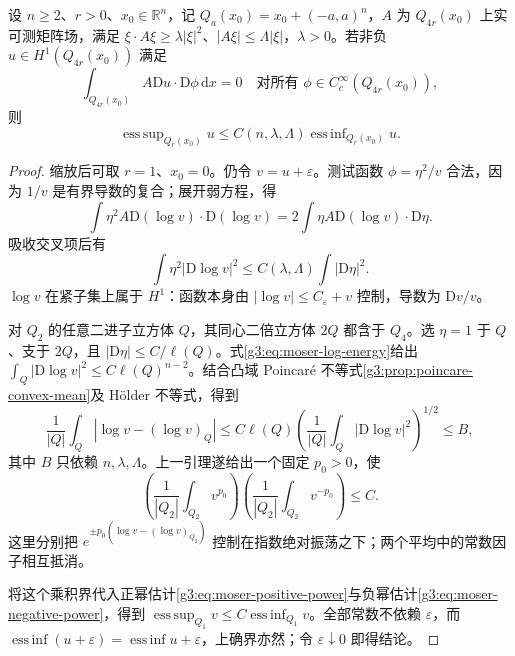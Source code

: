 \begin{theorem}\label{g3:thm:moser-harnack}
	设 \(n\ge2\)、\(r>0\)、\(x_0\in\mathbb R^n\)，记 \(Q_a(x_0)=x_0+(-a,a)^n\)，\(A\) 为 \(Q_{4r}(x_0)\) 上实可测矩阵场，满足
	\(\xi\cdot A\xi\ge\lambda|\xi|^2\)、\(|A\xi|\le\Lambda|\xi|\)，\(\lambda>0\)。若非负 \(u\in H^1(Q_{4r}(x_0))\) 满足
	\[
		\int_{Q_{4r}(x_0)} A\mathrm Du\cdot\mathrm D\phi\,\mathrm dx=0
		\quad\text{对所有 }\phi\in C_c^\infty(Q_{4r}(x_0)),
	\]
	则
	\begin{equation}\label{g3:eq:moser-harnack}
		\mathop{\mathrm{ess\,sup}}_{Q_r(x_0)}u
		\le C(n,\lambda,\Lambda)
		\mathop{\mathrm{ess\,inf}}_{Q_r(x_0)}u.
	\end{equation}
\end{theorem}
\begin{proof}
	缩放后可取 \(r=1\)、\(x_0=0\)。仍令 \(v=u+\varepsilon\)。测试函数 \(\phi=\eta^2/v\) 合法，因为 \(1/v\) 是有界导数的复合；展开弱方程，得
	\[
		\int\eta^2 A\mathrm D(\log v)\cdot\mathrm D(\log v)
		=2\int\eta A\mathrm D(\log v)\cdot\mathrm D\eta.
	\]
	吸收交叉项后有
	\begin{equation}\label{g3:eq:moser-log-energy}
		\int\eta^2|\mathrm D\log v|^2
		\le C(\lambda,\Lambda)\int|\mathrm D\eta|^2.
	\end{equation}
	\(\log v\) 在紧子集上属于 \(H^1\)：函数本身由 \(|\log v|\le C_\varepsilon+v\) 控制，导数为 \(\mathrm Dv/v\)。

	对 \(Q_2\) 的任意二进子立方体 \(Q\)，其同心二倍立方体 \(2Q\) 都含于 \(Q_4\)。选 \(\eta=1\) 于 \(Q\)、支于 \(2Q\)，且 \(|\mathrm D\eta|\le C/\ell(Q)\)。式\eqref{g3:eq:moser-log-energy}给出
	\(\int_Q|\mathrm D\log v|^2\le C\ell(Q)^{n-2}\)。结合凸域 Poincaré 不等式\cref{g3:prop:poincare-convex-mean}及 Hölder 不等式，得到
	\[
		\frac1{|Q|}\int_Q|\log v-(\log v)_Q|
		\le C\ell(Q)\left(\frac1{|Q|}\int_Q|\mathrm D\log v|^2\right)^{1/2}
		\le B,
	\]
	其中 \(B\) 只依赖 \(n,\lambda,\Lambda\)。上一引理遂给出一个固定 \(p_0>0\)，使
	\[
		\left(\frac1{|Q_2|}\int_{Q_2}v^{p_0}\right)
		\left(\frac1{|Q_2|}\int_{Q_2}v^{-p_0}\right)\le C.
	\]
	这里分别把 \(e^{\pm p_0(\log v-(\log v)_{Q_2})}\) 控制在指数绝对振荡之下；两个平均中的常数因子相互抵消。

	将这个乘积界代入正幂估计\eqref{g3:eq:moser-positive-power}与负幂估计\eqref{g3:eq:moser-negative-power}，得到
	\(\mathop{\mathrm{ess\,sup}}_{Q_1}v\le C\mathop{\mathrm{ess\,inf}}_{Q_1}v\)。全部常数不依赖 \(\varepsilon\)，而 \(\operatorname*{ess\,inf}(u+\varepsilon)=\operatorname*{ess\,inf}u+\varepsilon\)，上确界亦然；令 \(\varepsilon\downarrow0\) 即得结论。
\end{proof}

